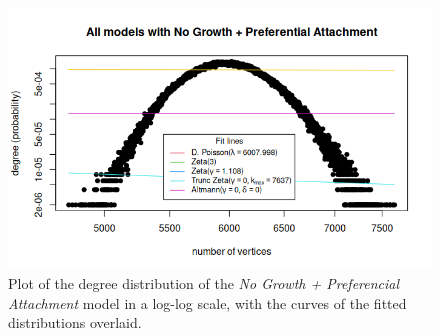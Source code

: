 \begin{figure}[ht]
\centering
\includegraphics[width=0.8\linewidth]{figures/degseq_fits/NG_degseq.png}
\caption{Plot of the degree distribution of the \textit{No Growth + Preferencial Attachment} model in a log-log scale, with the curves of the fitted distributions overlaid.}
\label{fig:degseq_NG}
\end{figure}